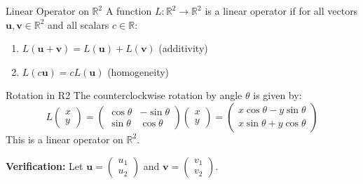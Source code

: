 \documentclass[12pt,a4paper]{article}
\newcommand{\R}{\mathbb{R}}
\newcommand{\vv}[1]{\mathbf{#1}}
\begin{document}
	\begin{definition}{Linear Operator on $\R^2$}
		A function $L: \R^2 \to \R^2$ is a linear operator if for all vectors $\vv{u}, \vv{v} \in \R^2$ and all scalars $c \in \R$:
		\begin{enumerate}[label=(\roman*)]
			\item $L(\vv{u} + \vv{v}) = L(\vv{u}) + L(\vv{v})$ \quad (additivity)
			\item $L(c\vv{u}) = cL(\vv{u})$ \quad (homogeneity)
		\end{enumerate}
	\end{definition}
	
	\begin{example}{Rotation in R2}
		The counterclockwise rotation by angle $\theta$ is given by:
		\[
		L\begin{pmatrix} x \\ y \end{pmatrix} = \begin{pmatrix} \cos\theta & -\sin\theta \\ \sin\theta & \cos\theta \end{pmatrix} \begin{pmatrix} x \\ y \end{pmatrix} = \begin{pmatrix} x\cos\theta - y\sin\theta \\ x\sin\theta + y\cos\theta \end{pmatrix}
		\]
		This is a linear operator on $\R^2$.
		
		\textbf{Verification:} Let $\vv{u} = \begin{pmatrix} u_1 \\ u_2 \end{pmatrix}$ and $\vv{v} = \begin{pmatrix} v_1 \\ v_2 \end{pmatrix}$.
		

\end{example}
\end{document}
